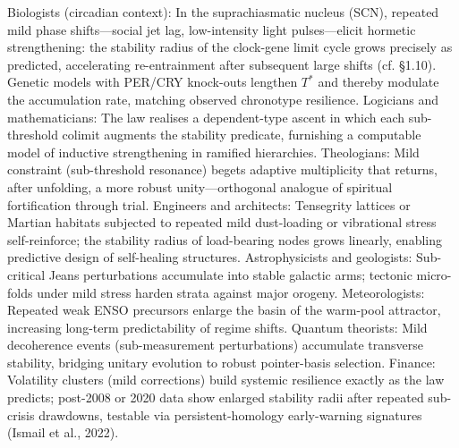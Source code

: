 Biologists (circadian context): In the suprachiasmatic nucleus (SCN), repeated mild phase shifts—social jet lag, low-intensity light pulses—elicit hormetic strengthening: the stability radius of the clock-gene limit cycle grows precisely as predicted, accelerating re-entrainment after subsequent large shifts (cf. §1.10). Genetic models with PER/CRY knock-outs lengthen $  T^*  $ and thereby modulate the accumulation rate, matching observed chronotype resilience.
Logicians and mathematicians: The law realises a dependent-type ascent in which each sub-threshold colimit augments the stability predicate, furnishing a computable model of inductive strengthening in ramified hierarchies.
Theologians: Mild constraint (sub-threshold resonance) begets adaptive multiplicity that returns, after unfolding, a more robust unity—orthogonal analogue of spiritual fortification through trial.
Engineers and architects: Tensegrity lattices or Martian habitats subjected to repeated mild dust-loading or vibrational stress self-reinforce; the stability radius of load-bearing nodes grows linearly, enabling predictive design of self-healing structures.
Astrophysicists and geologists: Sub-critical Jeans perturbations accumulate into stable galactic arms; tectonic micro-folds under mild stress harden strata against major orogeny.
Meteorologists: Repeated weak ENSO precursors enlarge the basin of the warm-pool attractor, increasing long-term predictability of regime shifts.
Quantum theorists: Mild decoherence events (sub-measurement perturbations) accumulate transverse stability, bridging unitary evolution to robust pointer-basis selection.
Finance: Volatility clusters (mild corrections) build systemic resilience exactly as the law predicts; post-2008 or 2020 data show enlarged stability radii after repeated sub-crisis drawdowns, testable via persistent-homology early-warning signatures (Ismail et al., 2022).

